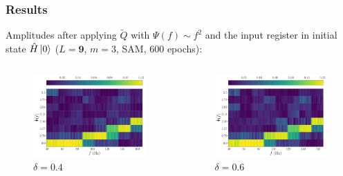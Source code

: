 \documentclass{beamer}
\begin{document}
\begin{frame}
\frametitle{Results}
Amplitudes after applying $\tilde{Q}$ with $\Psi(f) \sim f^2$ and the input register in initial state $\hat{H} \ket{0}$ ($L=\boldsymbol{9}$, $m=3$, SAM, 600 epochs):
\begin{columns}
\begin{column}{0.5\textwidth}
\begin{figure}
\centering
\includegraphics[width=\textwidth]{im/Q_amp_quadratic_0.4_H.pdf}
\caption{$\delta =0.4$}
\end{figure}
\end{column}
\begin{column}{0.5\textwidth}
\begin{figure}
\centering
\includegraphics[width=\textwidth]{im/Q_amp_quadratic_0.6_H.pdf}
\caption{$\delta =0.6$}
\end{figure} 
\end{column}
\end{columns}
\end{frame}
\end{document}

